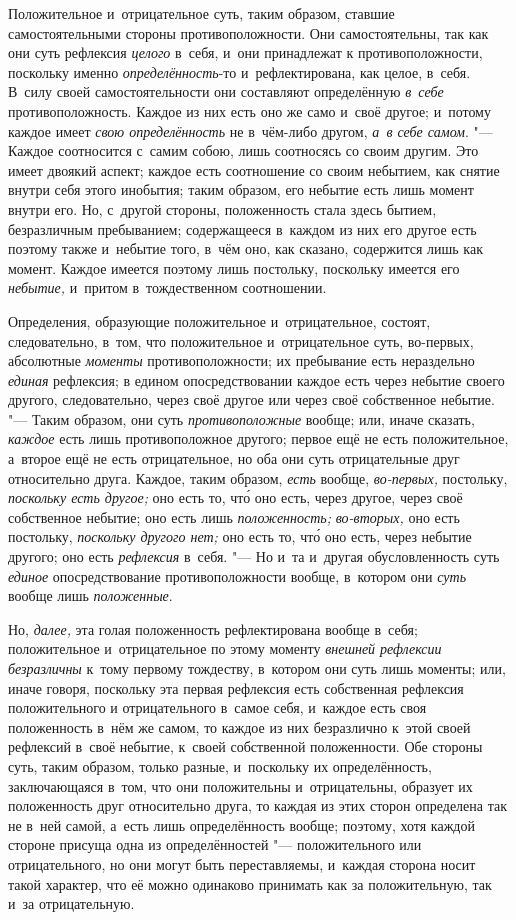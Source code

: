 Положительное и~отрицательное суть, таким образом, ставшие самостоятельными
стороны противоположности. Они самостоятельны, так как они суть рефлексия
{\em целого} в~себя, и~они принадлежат к
противоположности, поскольку именно
{\em определённость}-то и~рефлектирована, как целое,
в~себя. В~силу своей самостоятельности они составляют определённую
{\em в~себе} противоположность. Каждое из них есть оно
же само и~своё другое; и~потому каждое имеет {\em свою
определённость} не в~чём-либо другом, {\em а~в себе
самом}. "--- Каждое соотносится с~самим собою, лишь соотносясь со своим
другим. Это имеет двоякий аспект; каждое есть соотношение со своим
небытием, как снятие внутри себя этого инобытия; таким образом, его небытие
есть лишь момент внутри его. Но, с~другой стороны, положенность стала здесь
бытием, безразличным пребыванием; содержащееся в~каждом из них его другое
есть поэтому также и~небытие того, в~чём оно, как сказано, содержится лишь
как момент. Каждое имеется поэтому лишь постольку, поскольку имеется его
{\em небытие,} и~притом в~тождественном соотношении.

Определения, образующие положительное и~отрицательное, состоят,
следовательно, в~том, что положительное и~отрицательное суть, во-первых,
абсолютные {\em моменты} противоположности; их
пребывание есть нераздельно {\em единая} рефлексия; в
едином опосредствовании каждое есть через небытие своего другого,
следовательно, через своё другое или через своё собственное небытие. "---
Таким образом, они суть {\em противоположные} вообще;
или, иначе сказать, {\em каждое} есть лишь
противоположное другого; первое ещё не есть положительное, а~второе ещё не
есть отрицательное, но оба они суть отрицательные друг относительно друга.
Каждое, таким образом, {\em есть} вообще,
{\em во-первых,} постольку,
{\em поскольку есть другое;} оно есть то, чт\'{о} оно есть,
через другое, через своё собственное небытие; оно есть лишь
{\em положенность;} {\em во-вторых,} оно есть постольку,
{\em поскольку другого нет;} оно есть то, чт\'{о} оно есть,
через небытие другого; оно есть {\em рефлексия} в~себя.
"--- Но и~та и~другая обусловленность суть {\em единое}
опосредствование противоположности вообще, в~котором они
{\em суть} вообще лишь {\em положенные}.

Но, {\em далее,} эта голая положенность рефлектирована
вообще в~себя; положительное и~отрицательное по этому моменту
{\em внешней рефлексии безразличны} к~тому первому
тождеству, в~котором они суть лишь моменты; или, иначе говоря, поскольку
эта первая рефлексия есть собственная рефлексия положительного и
отрицательного в~самое себя, и~каждое есть своя положенность в~нём же
самом, то каждое из них безразлично к~этой своей рефлексий в~своё небытие,
к~своей собственной положенности. Обе стороны суть, таким образом, только
разные, и~поскольку их определённость, заключающаяся в~том, что они
положительны и~отрицательны, образует их положенность друг относительно
друга, то каждая из этих сторон определена так не в~ней самой, а~есть лишь
определённость вообще; поэтому, хотя каждой стороне присуща одна из
определённостей "--- положительного или отрицательного, но они могут быть
переставляемы, и~каждая сторона носит такой характер, что её можно
одинаково принимать как за положительную, так и~за отрицательную.

